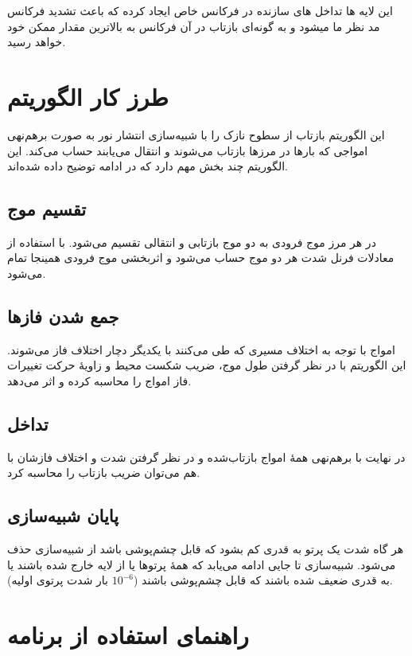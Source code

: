 \documentclass{article}
\begin{document}
	این لایه ها تداخل های سازنده در فرکانس خاص ایجاد کرده که باعث تشدید فرکانس مد نظر ما میشود و به‌ گونه‌ای بازتاب در آن فرکانس به بالاترین مقدار ممکن خود خواهد رسید. 
	\newpage
	
	
	
	\section*{طرز کار الگوریتم}
		
		این الگوریتم بازتاب از سطوح نازک را با شبیه‌سازی انتشار نور به صورت برهم‌نهی امواجی که بارها در مرزها بازتاب می‌شوند و انتقال می‌یابند حساب می‌کند. این الگوریتم چند بخش مهم دارد که در ادامه توضیح داده شده‌اند.
		
	\subsection*{تقسیم موج}
		
		در هر مرز موج فرودی به دو موج بازتابی و انتقالی تقسیم می‌شود. با استفاده از معادلات فرنل شدت هر دو موج حساب می‌شود و اثربخشی موج فرودی همینجا تمام می‌شود.
		
	\subsection*{جمع شدن فازها}
		
		امواج با توجه به اختلاف مسیری که طی می‌کنند با یکدیگر دچار اختلاف فاز می‌شوند. این الگوریتم با در نظر گرفتن طول موج، ضریب شکست محیط و زاویهٔ حرکت تغییرات فاز امواج را محاسبه کرده و اثر می‌دهد.
		
	\subsection*{تداخل}
		
		در نهایت با برهم‌نهی همهٔ امواج بازتاب‌شده و در نظر گرفتن شدت و اختلاف فازشان با هم می‌توان ضریب بازتاب را محاسبه کرد.
		
	\subsection*{پایان شبیه‌سازی}
		
		هر گاه شدت یک پرتو به قدری کم بشود که قابل چشم‌پوشی باشد از شبیه‌سازی حذف می‌شود. شبیه‌سازی تا جایی ادامه می‌یابد که همهٔ پرتوها یا از لایه خارج شده باشند یا به قدری ضعیف شده باشند که قابل چشم‌پوشی باشند ($10^{-6}$ بار شدت پرتوی اولیه).
		
	\section*{راهنمای استفاده از برنامه}
		
\end{document}
